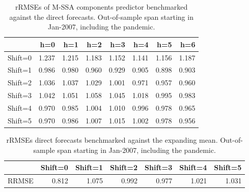 \documentclass[a4paper]{article}
\begin{document}
\begin{table}[ht]
\centering
\begin{tabular}{rrrrrrrr}
  \hline
 & h=0 & h=1 & h=2 & h=3 & h=4 & h=5 & h=6 \\ 
  \hline
Shift=0 & 1.237 & 1.215 & 1.183 & 1.152 & 1.141 & 1.156 & 1.187 \\ 
  Shift=1 & 0.986 & 0.980 & 0.960 & 0.929 & 0.905 & 0.898 & 0.903 \\ 
  Shift=2 & 1.036 & 1.037 & 1.029 & 1.001 & 0.971 & 0.957 & 0.960 \\ 
  Shift=3 & 1.042 & 1.051 & 1.058 & 1.045 & 1.018 & 0.995 & 0.983 \\ 
  Shift=4 & 0.970 & 0.985 & 1.004 & 1.010 & 0.996 & 0.978 & 0.965 \\ 
  Shift=5 & 0.970 & 0.986 & 1.007 & 1.015 & 1.002 & 0.978 & 0.956 \\ 
   \hline
\end{tabular}
\caption{rRMSEs of M-SSA components predictor benchmarked against the direct forecasts. Out-of-sample span starting in Jan-2007, including the pandemic.} 
\label{rRMSE_mSSA_comp_direct3}
\end{table}%
\begin{table}[ht]
\centering
\begin{tabular}{rrrrrrr}
  \hline
 & Shift=0 & Shift=1 & Shift=2 & Shift=3 & Shift=4 & Shift=5 \\ 
  \hline
RRMSE & 0.812 & 1.075 & 0.992 & 0.977 & 1.021 & 1.031 \\ 
   \hline
\end{tabular}
\caption{rRMSEs direct forecasts benchmarked against the expanding mean. Out-of-sample span starting in Jan-2007, including the pandemic.} 
\label{rRMSE_mSSA_direct_mean4}
\end{table}
\end{document}
